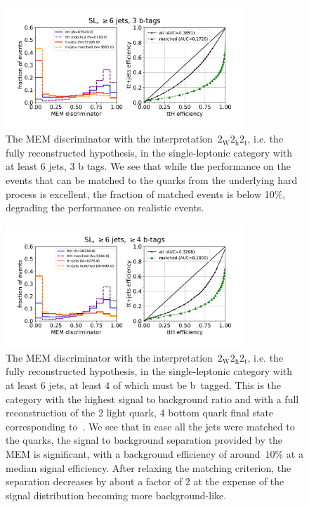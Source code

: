 \begin{figure}[ht]
\begin{centering}
\includegraphics[width = 0.8\textwidth]{figures/mem/mem_sl_jge6_t3.pdf}
\caption[MEM with the $2_{\mathrm{W}} 2_{\mathrm{h}} 2_{\mathrm{t}}$ interpretation in the $\ge6$ jets, 3~b tags category]{The MEM discriminator with the interpretation~$2_{\mathrm{W}} 2_{\mathrm{h}} 2_{\mathrm{t}}$, i.e. the fully reconstructed hypothesis, in the single-leptonic category with at least 6 jets, 3 b tags. We see that while the performance on the events that can be matched to the quarks from the underlying hard process is excellent, the fraction of matched events is below 10\%, degrading the performance on realistic events.}
\label{fig:mem_sl_jge6_t3}
\end{centering}
\end{figure}

\begin{figure}[ht]
\begin{centering}
\includegraphics[width = 0.8\textwidth]{figures/mem/mem_sl_jge6_tge4.pdf}
\caption[MEM with the~$2_{\mathrm{W}} 2_{\mathrm{h}} 2_{\mathrm{t}}$ interpretation in the $\ge6$ jet, $\ge4$ b~tag category]{The MEM discriminator with the interpretation~$2_{\mathrm{W}} 2_{\mathrm{h}} 2_{\mathrm{t}}$, i.e. the fully reconstructed hypothesis, in the single-leptonic category with at least 6 jets, at least 4 of which must be b~tagged. This is the category with the highest signal to background ratio and with a full reconstruction of the 2 light quark, 4 bottom quark final state corresponding to~\ttHbb. We see that in case all the jets were matched to the quarks, the signal to background separation provided by the MEM is significant, with a background efficiency of around~$10\%$ at a median signal efficiency. After relaxing the matching criterion, the separation decreases by about a factor of 2 at the expense of the signal distribution becoming more background-like.}
\label{fig:mem_sl_jge6_tge4}
\end{centering}
\end{figure}

